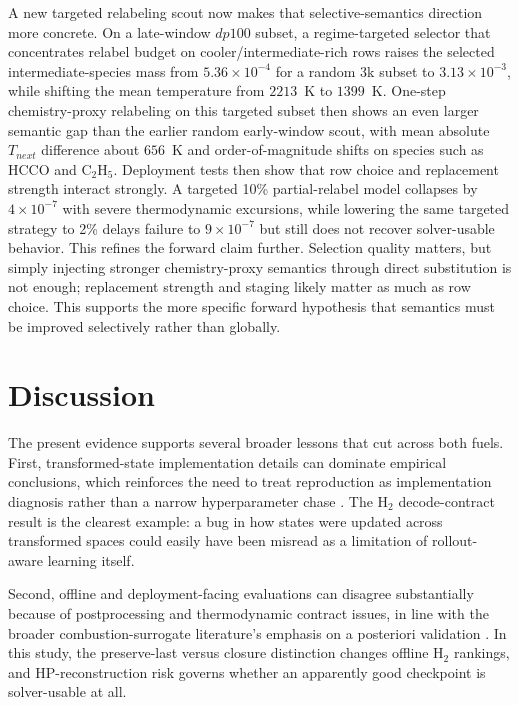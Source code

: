 \documentclass[11pt]{article}
\begin{document}
A new targeted relabeling scout now makes that selective-semantics direction more concrete. On a late-window $dp100$ subset, a regime-targeted selector that concentrates relabel budget on cooler/intermediate-rich rows raises the selected intermediate-species mass from $5.36\times10^{-4}$ for a random 3k subset to $3.13\times10^{-3}$, while shifting the mean temperature from $2213$~K to $1399$~K. One-step chemistry-proxy relabeling on this targeted subset then shows an even larger semantic gap than the earlier random early-window scout, with mean absolute $T_{next}$ difference about $656$~K and order-of-magnitude shifts on species such as HCCO and C$_2$H$_5$. Deployment tests then show that row choice and replacement strength interact strongly. A targeted 10\% partial-relabel model collapses by $4\times10^{-7}$ with severe thermodynamic excursions, while lowering the same targeted strategy to 2\% delays failure to $9\times10^{-7}$ but still does not recover solver-usable behavior. This refines the forward claim further. Selection quality matters, but simply injecting stronger chemistry-proxy semantics through direct substitution is not enough; replacement strength and staging likely matter as much as row choice. This supports the more specific forward hypothesis that semantics must be improved selectively rather than globally.

\section{Discussion}
The present evidence supports several broader lessons that cut across both fuels. First, transformed-state implementation details can dominate empirical conclusions, which reinforces the need to treat reproduction as implementation diagnosis rather than a narrow hyperparameter chase \cite{weng2025efno}. The H$_2$ decode-contract result is the clearest example: a bug in how states were updated across transformed spaces could easily have been misread as a limitation of rollout-aware learning itself.

Second, offline and deployment-facing evaluations can disagree substantially because of postprocessing and thermodynamic contract issues, in line with the broader combustion-surrogate literature's emphasis on a posteriori validation \cite{li2025comprehensive,wu2025nh3h2}. In this study, the preserve-last versus closure distinction changes offline H$_2$ rankings, and HP-reconstruction risk governs whether an apparently good checkpoint is solver-usable at all.
\end{document}
